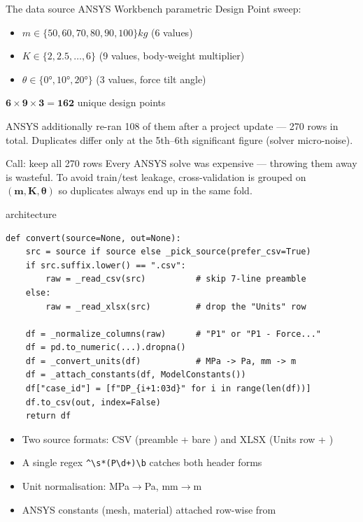 \begin{frame}{The data source}
  ANSYS Workbench parametric Design Point sweep:
  \begin{itemize}
    \item \(m \in \{50, 60, 70, 80, 90, 100\}\unit{kg}\) (6 values)
    \item \(K \in \{2, 2.5, \ldots, 6\}\) (9 values, body-weight multiplier)
    \item \(\theta \in \{0°, 10°, 20°\}\) (3 values, force tilt angle)
  \end{itemize}
  \vspace{0.3cm}
  \begin{center}
    \(\boldsymbol{6 \times 9 \times 3 = 162}\) unique design points
  \end{center}
  \vspace{0.3cm}
  ANSYS additionally re-ran 108 of them after a project update --- 270
  rows in total. Duplicates differ only at the 5th--6th significant figure
  (solver micro-noise).

  \vspace{0.3cm}
  \begin{block}{Call: keep all 270 rows}
    \footnotesize
    Every ANSYS solve was expensive --- throwing them away is wasteful.
    To avoid train/test leakage, cross-validation is
    \alert{grouped on \(\boldsymbol{(m, K, \theta)}\)} so duplicates
    always end up in the same fold.
  \end{block}
\end{frame}

\begin{frame}[fragile]{ architecture}
\begin{lstlisting}
def convert(source=None, out=None):
    src = source if source else _pick_source(prefer_csv=True)
    if src.suffix.lower() == ".csv":
        raw = _read_csv(src)          # skip 7-line preamble
    else:
        raw = _read_xlsx(src)         # drop the "Units" row

    df = _normalize_columns(raw)      # "P1" or "P1 - Force..."
    df = pd.to_numeric(...).dropna()
    df = _convert_units(df)           # MPa -> Pa, mm -> m
    df = _attach_constants(df, ModelConstants())
    df["case_id"] = [f"DP_{i+1:03d}" for i in range(len(df))]
    df.to_csv(out, index=False)
    return df
\end{lstlisting}

  \begin{itemize}\small
    \item Two source formats: CSV (preamble + bare ) and XLSX
          (Units row + )
    \item A single regex \verb|^\s*(P\d+)\b| catches both header forms
    \item Unit normalisation: MPa\(\to\)Pa, mm\(\to\)m
    \item ANSYS constants (mesh, material) attached row-wise from 
  \end{itemize}
\end{frame}


